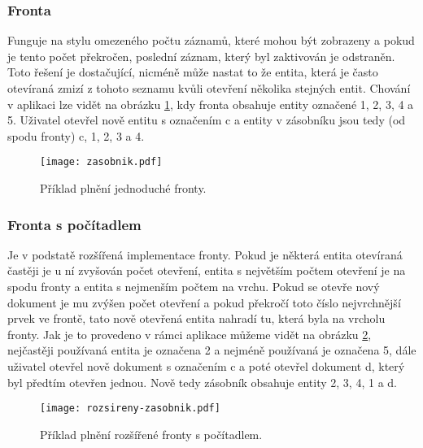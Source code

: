 \subsubsection{Fronta}
\par Funguje na stylu omezeného počtu záznamů, které mohou být zobrazeny a pokud je tento počet překročen, poslední záznam, který byl zaktivován je odstraněn. Toto řešení je dostačující, nicméně může nastat to že entita, která je často otevíraná zmizí z tohoto seznamu kvůli otevření několika stejných entit. Chování v aplikaci lze vidět na obrázku \ref{zasobnik}, kdy fronta obsahuje entity označené 1, 2, 3, 4 a 5. Uživatel otevřel nově entitu s označením c a entity v zásobníku jsou tedy (od spodu fronty) c, 1, 2, 3 a 4.
\begin{figure}[htp]
\centering
\texttt{[image: zasobnik.pdf]}
\caption{Příklad plnění jednoduché fronty.}
\label{zasobnik}
\end{figure}

\subsubsection{Fronta s počítadlem}
\par Je v podstatě rozšířená implementace fronty. Pokud je některá entita otevíraná častěji je u ní zvyšován počet otevření, entita s největším počtem otevření je na spodu fronty a entita s nejmenším počtem na vrchu. Pokud se otevře nový dokument je mu zvýšen počet otevření a pokud překročí toto číslo nejvrchnější prvek ve frontě, tato nově otevřená entita nahradí tu, která byla na vrcholu fronty. Jak je to provedeno v rámci aplikace můžeme vidět na obrázku \ref{counter}, nejčastěji používaná entita je označena 2 a nejméně používaná je označena 5, dále uživatel otevřel nově dokument s označením c a poté otevřel dokument d, který byl předtím otevřen jednou. Nově tedy zásobník obsahuje entity 2, 3, 4, 1 a d.
\begin{figure}[htp]
\centering
\texttt{[image: rozsireny-zasobnik.pdf]}
\caption{Příklad plnění rozšířené fronty s počítadlem.}
\label{counter}
\end{figure}

